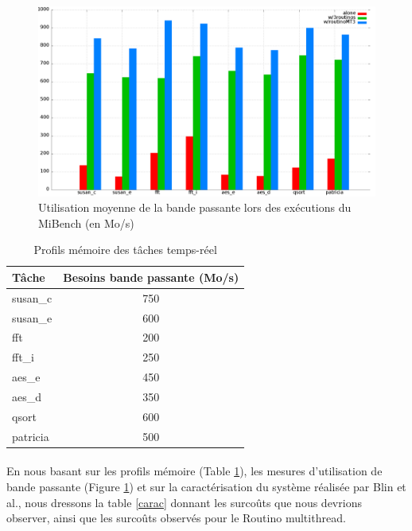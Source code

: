 \begin{figure}
\centering
\includegraphics[scale=0.3]{include/bandwidth.png}
\caption{Utilisation moyenne de la bande passante lors des exécutions du
 MiBench (en Mo/s)}
\label{bandwidth}
\end{figure}

\begin{table}[H]
\centering
\begin{tabular}{l|c}
Tâche & Besoins bande passante (Mo/s)\\
\hline
susan\_c & 750\\
susan\_e & 600\\
fft      & 200\\
fft\_i   & 250\\
aes\_e   & 450\\
aes\_d   & 350\\
qsort    & 600\\
patricia & 500\\
\end{tabular}
\caption{Profils mémoire des tâches temps-réel}
\label{measures}
\end{table}

\paragraph{}
En nous basant sur les profils mémoire (Table \ref{measures}), les
mesures d'utilisation de bande passante (Figure \ref{bandwidth}) et sur la
caractérisation du système réalisée par Blin et al.\cite{blin_protecting_2015},
nous dressons la table \ref{carac} donnant les surcoûts que nous devrions
observer, ainsi que les surcoûts observés pour le Routino multithread.

